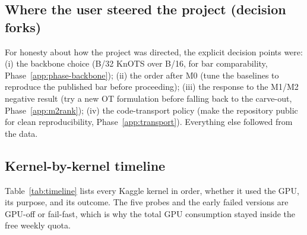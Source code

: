 \documentclass[11pt]{article}
\begin{document}
\subsection{Where the user steered the project (decision forks)}
For honesty about how the project was directed, the explicit decision points were: (i) the backbone
choice (B/32 KnOTS over B/16, for bar comparability, Phase~\ref{app:phase-backbone}); (ii) the order after
M0 (tune the baselines to reproduce the published bar before proceeding); (iii) the response to the M1/M2
negative result (try a new OT formulation before falling back to the carve-out, Phase~\ref{app:m2rank});
(iv) the code-transport policy (make the repository public for clean reproducibility,
Phase~\ref{app:transport}). Everything else followed from the data.

\subsection{Kernel-by-kernel timeline}
Table~\ref{tab:timeline} lists every Kaggle kernel in order, whether it used the GPU, its purpose, and its
outcome. The five probes and the early failed versions are GPU-off or fail-fast, which is why the total
GPU consumption stayed inside the free weekly quota.
\end{document}

